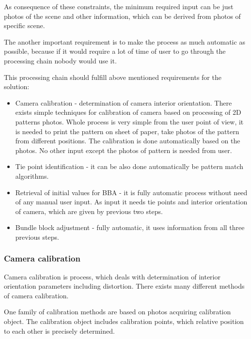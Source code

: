 \documentclass[a4paper,12pt]{article}
\begin{document}
As consequence of these constraints, the minimum required input can be just photos
of the scene and other information, which can be derived from photos of specific scene.

The another important requirement is to make the process as much automatic as possible, because 
if it would require a lot of time of user to go through the processing chain nobody would use it.


This processing chain should fulfill above mentioned requirements for the solution:

\begin{itemize}
\item Camera calibration - determination of camera interior orientation. There exists simple techniques for calibration
of camera based on processing of 2D patterns photos. Whole process is very simple from the user point of view, it is needed 
to print the pattern on sheet of paper, take photos of the pattern from different positions. The calibration 
is done automatically based on the photos. No other input except the photos of pattern is needed from user.
\item Tie point identification - it can be also done automatically be pattern match algorithms.
\item Retrieval of initial values for BBA - it is fully automatic process without need of any manual user input.
As input it needs tie points and interior orientation of camera, which are given by previous two steps.
\item Bundle block adjustment - fully automatic, it uses information from all three previous steps.
\end{itemize}

 
\subsubsection{Camera calibration}

Camera calibration is process, which deals with determination of interior orientation parameters including distortion.
There exists many different methods of camera calibration.

One family of calibration methods are based on photos acquiring calibration object.
The calibration object includes calibration points, which relative position to each other is  precisely determined.  
\end{document}
